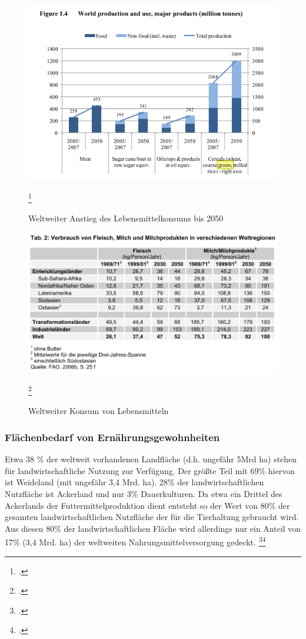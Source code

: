 \documentclass{scrartcl}
\begin{document}
\begin{figure}[htbp]
\centering
\includegraphics[width=16cm]{image_folder/2030S8.png}
\caption{Weltweiter Anstieg des Lebensmittelkonsums bis 2050}
\label{fig:konsumbis2050}\footcite[vgl.][S.8]{FAO2006World2030/2050} 
\end{figure}

\begin{figure}[htbp]
\centering
\includegraphics[width=16cm]{image_folder/KonsumWeltweit.png}
\caption{Weltweiter Konsum von Lebensmitteln}
\label{fig:konsumweltweit}\footcite[S.4f]{VonKoerber2008Globale-trends}
\end{figure}


\subsubsection{Flächenbedarf von Ernährungsgewohnheiten}

Etwa 38 \% der weltweit vorhandenen Landfläche (d.h. ungefähr 5Mrd ha) stehen für landwirtschaftliche Nutzung zur Verfügung. Der größte Teil mit 69\% hiervon ist Weideland (mit ungefähr 3,4 Mrd. ha). 28\% der landwirtschaftlichen Nutzfläche ist Ackerland und nur 3\% Dauerkulturen.
Da etwa ein Drittel des Ackerlands der Futtermittelproduktion dient entsteht so der Wert von 80\% der gesamten landwirtschaftlichen Nutzfläche der für die Tierhaltung gebraucht wird. Aus diesen 80\% der landwirtschaftlichen Fläche wird allerdings nur ein Anteil von 17\% (3,4 Mrd. ha) der weltweiten Nahrungsmittelversorgung gedeckt. \footcite{2008FAOSTAT}\footcite[Vgl.][S.6]{VonKoerber2008Globale-trends}
\end{document}
